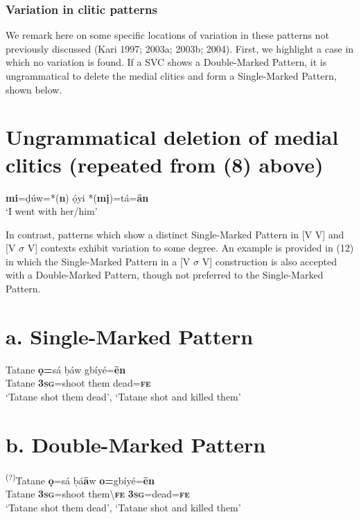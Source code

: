 \subsection{\rmfamily Variation in clitic patterns}
\label{bkm:Ref449531511}
We remark here on some specific locations of variation in these patterns not previously discussed (Kari 1997; 2003a; 2003b; 2004). First, we highlight a case in which no variation is found. If a SVC shows a Double-Marked Pattern, it is ungrammatical to delete the medial clitics and form a Single-Marked Pattern, shown below.

\chapter[Ungrammatical deletion of medial clitics (repeated from (8) above)]{Ungrammatical deletion of medial clitics (repeated from (8) above)}
\gll \textbf{mi}=ḍúw=*(\textbf{n})   ọ́yi   *(\textbf{mị})=tá=\textbf{\={a}n}\\
\glt ‘I went with her/him’ \citep[201]{Kari2004}
\z

In contrast, patterns which show a distinct Single-Marked Pattern in [V V] and [V $\sigma $ V] contexts exhibit variation to some degree. An example is provided in (12) in which the Single-Marked Pattern in a [V $\sigma $ V] construction is also accepted with a Double-Marked Pattern, though not preferred to the Single-Marked Pattern.

\chapter[a. Single{}-Marked Pattern ]{a. Single-Marked Pattern }
\label{bkm:Ref448138971}\label{bkm:Ref448215142}\gll   Tatane  \textbf{ọ=}sá    ḅáw   gbíyé=\textbf{\={e}n}\\
     Tatane  \textbf{3}\textbf{\textsc{sg}}=shoot  them   dead=\textbf{\textsc{fe}}\\
\glt ‘Tatane shot them dead’, ‘Tatane shot and killed them’ 
\z

\chapter{b. Double-Marked Pattern}
\gll \textsuperscript{(?)}Tatane  \textbf{ọ}=sá    ḅá\textbf{\={a}}w    \textbf{o=}gbíyé=\textbf{\={e}n}\\
     Tatane  \textbf{3}\textbf{\textsc{sg}}=shoot   them{\textbackslash}\textbf{\textsc{fe    }}\textbf{3}\textbf{\textsc{sg}}=dead=\textbf{\textsc{fe}}\\
\glt ‘Tatane shot them dead’, ‘Tatane shot and killed them’
\z

